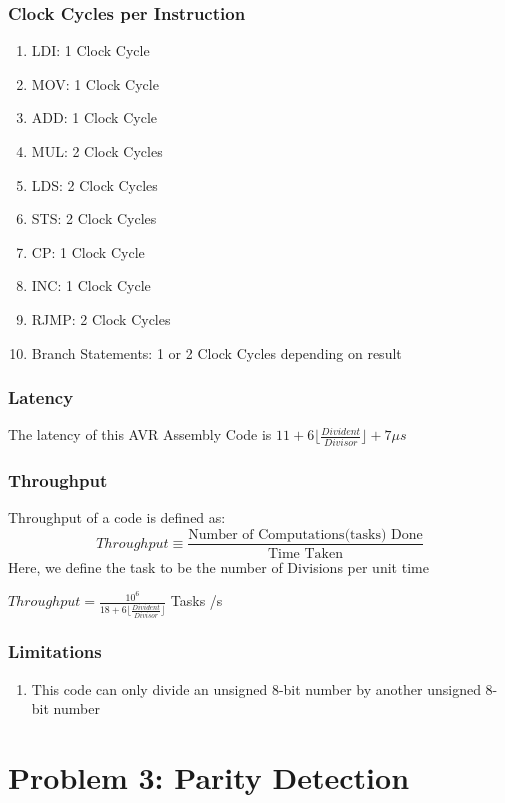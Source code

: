 \documentclass[titlepage, 11pt]{article}
\begin{document}
\subsubsection{Clock Cycles per Instruction}
\begin{enumerate}
\item LDI: 1 Clock Cycle
\item MOV: 1 Clock Cycle
\item ADD: 1 Clock Cycle
\item MUL: 2 Clock Cycles
\item LDS: 2 Clock Cycles
\item STS: 2 Clock Cycles
\item CP: 1 Clock Cycle
\item INC: 1 Clock Cycle
\item RJMP: 2 Clock Cycles
\item Branch Statements: 1 or 2 Clock Cycles depending on result
\end{enumerate}

\subsubsection{Latency}
The latency of this AVR Assembly Code is $11 +6 \lfloor \frac{Divident}{Divisor} \rfloor + 7 \mu s$

\subsubsection{Throughput}
Throughput of a code is defined as:
$$ Throughput \equiv \frac{\text{Number of Computations(tasks) Done}}{\text{Time Taken}}$$
Here, we define the task to be the number of Divisions per unit time

$Throughput= \frac{10^{6}}{18 +6 \lfloor \frac{Divident}{Divisor} \rfloor} $ Tasks /s

\subsubsection{Limitations}
\begin{enumerate}
\item This code can only divide an unsigned 8-bit number by another unsigned 8-bit number
\end{enumerate}

\section{Problem 3: Parity Detection}
\end{document}
